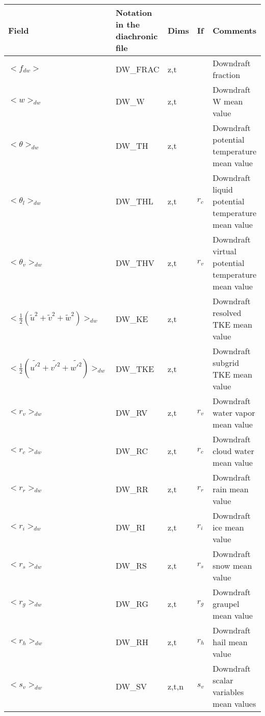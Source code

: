 \begin{longtable}[c]{|p{}|p{}|p{}|p{}|p{}|}
\hline
Field & Notation in the diachronic file & Dims & If  & Comments \\
\hline \hline
\endhead
$<f_{dw}>$                                    & DW\_FRAC  & z,t   &       & Downdraft fraction \\\hline
$<w>_{dw}$                                    & DW\_W     & z,t   &       & Downdraft W mean value \\\hline
$<\theta>_{dw}$                               & DW\_TH    & z,t   &       & Downdraft potential temperature mean value \\\hline
$<\theta_l>_{dw}$                             & DW\_THL   & z,t   & $r_c$ & Downdraft liquid potential temperature mean value \\\hline
$<\theta_v>_{dw}$                             & DW\_THV   & z,t   & $r_v$ & Downdraft virtual potential temperature mean value \\\hline
$<\frac{1}{2}(\tilde{u}^2+\tilde{v}^2+\tilde{w}^2)>_{dw}$ & DW\_KE & z,t & & Downdraft resolved TKE mean value \\\hline
$<\frac{1}{2}(\tilde{u'^2}+\tilde{v'^2}+\tilde{w'^2})>_{dw}$ & DW\_TKE & z,t & & Downdraft subgrid TKE mean value \\\hline
$<r_v>_{dw}$                                  & DW\_RV    & z,t   & $r_v$ & Downdraft water vapor mean value \\\hline
$<r_c>_{dw}$                                  & DW\_RC    & z,t   & $r_c$ & Downdraft cloud water mean value \\\hline
$<r_r>_{dw}$                                  & DW\_RR    & z,t   & $r_r$ & Downdraft rain mean value \\\hline
$<r_i>_{dw}$                                  & DW\_RI    & z,t   & $r_i$ & Downdraft ice mean value \\\hline
$<r_s>_{dw}$                                  & DW\_RS    & z,t   & $r_s$ & Downdraft snow mean value \\\hline
$<r_g>_{dw}$                                  & DW\_RG    & z,t   & $r_g$ & Downdraft graupel mean value \\\hline
$<r_h>_{dw}$                                  & DW\_RH    & z,t   & $r_h$ & Downdraft hail mean value \\\hline
$<s_v>_{dw}$                                  & DW\_SV    & z,t,n & $s_v$ & Downdraft scalar variables mean values \\\hline

\end{longtable}
